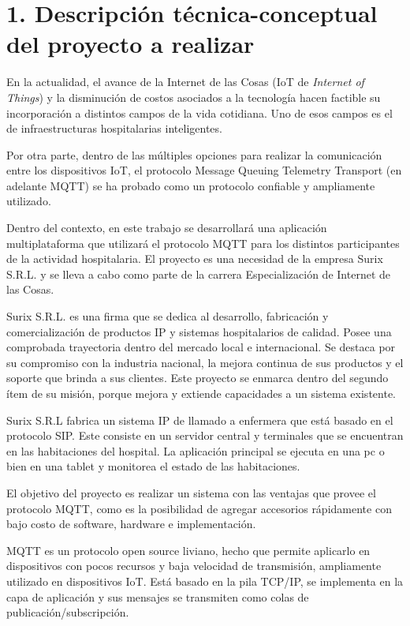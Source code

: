 \documentclass[
11pt, %
]{charter}
\begin{document}
\section{1. Descripción técnica-conceptual del proyecto a realizar}
\label{sec:descripcion}


En la actualidad, el avance de la Internet de las Cosas (IoT de \textit{Internet of Things}) y la disminución de costos asociados a la tecnología hacen factible su incorporación a distintos campos de la vida cotidiana. Uno de esos campos es el de infraestructuras hospitalarias inteligentes. 

Por otra parte, dentro de las múltiples opciones para realizar la comunicación entre los dispositivos IoT, el protocolo Message Queuing Telemetry Transport (en adelante MQTT) se ha probado como un protocolo confiable y ampliamente utilizado.

Dentro del contexto, en este trabajo se desarrollará una aplicación multiplataforma que utilizará el protocolo MQTT para los distintos participantes  de la actividad hospitalaria. El proyecto es una necesidad de la empresa Surix S.R.L. y se lleva a cabo como parte de la carrera Especialización de Internet de las Cosas.

Surix S.R.L. es una firma que se dedica al desarrollo, fabricación y comercialización de productos IP y sistemas hospitalarios de calidad. Posee una comprobada trayectoria dentro del mercado local e internacional. Se destaca por su compromiso con la industria nacional, la mejora continua de sus productos y el soporte que brinda a sus clientes. Este proyecto se enmarca dentro del segundo ítem de su misión, porque mejora y extiende capacidades a un sistema existente. 

Surix S.R.L fabrica un sistema IP de llamado a enfermera que está basado en el protocolo SIP. Este consiste en un servidor central y terminales que se encuentran en las habitaciones del hospital. La aplicación principal se ejecuta en una pc o bien en una tablet y monitorea el estado de las habitaciones. 
 
El objetivo del proyecto es realizar un sistema con las ventajas que provee el protocolo MQTT, como es la posibilidad de agregar accesorios rápidamente con bajo costo de software, hardware e implementación. 

MQTT es un protocolo open source liviano, hecho que permite aplicarlo en dispositivos con pocos recursos y baja velocidad de transmisión, ampliamente utilizado en dispositivos IoT. Está basado en la pila TCP/IP, se implementa en la capa de aplicación y sus mensajes se transmiten como colas de publicación/subscripción. 
\end{document}
